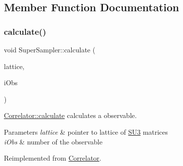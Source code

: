 \subsection{Member Function Documentation}
\mbox{\label{class_super_sampler_a7e1457583270077c4fbcb288ea9b954c}} 
\subsubsection{\texorpdfstring{calculate()}{calculate()}}
{\footnotesize\ttfamily void Super\+Sampler\+::calculate (\begin{DoxyParamCaption}\item[{\mbox{\hyperlink{class_lattice}{Lattice}}$<$ \mbox{\hyperlink{class_s_u3}{S\+U3}} $>$ $\ast$}]{lattice,  }\item[{unsigned int}]{i\+Obs }\end{DoxyParamCaption})\hspace{0.3cm}{\ttfamily [virtual]}}



\mbox{\hyperlink{class_correlator_ab33502ff305f891c5c2e6d66a26a0247}{Correlator\+::calculate}} calculates a observable. 


\begin{DoxyParams}{Parameters}
{\em lattice} & pointer to lattice of \mbox{\hyperlink{class_s_u3}{S\+U3}} matrices \\
\hline
{\em i\+Obs} & number of the observable \\
\hline
\end{DoxyParams}


Reimplemented from \mbox{\hyperlink{class_correlator_ab33502ff305f891c5c2e6d66a26a0247}{Correlator}}.

